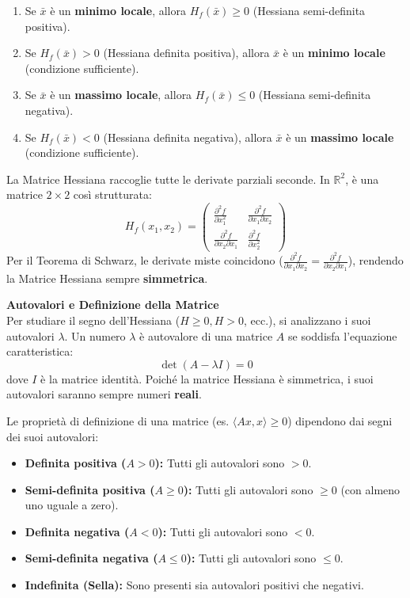 \documentclass[12pt, a4paper]{article}
\begin{document}
	\begin{enumerate}[label=(\Roman*)]
		\item Se $\bar{x}$ è un \textbf{minimo locale}, allora $H_f(\bar{x}) \ge 0$ (Hessiana semi-definita positiva).
		\item Se $H_f(\bar{x}) > 0$ (Hessiana definita positiva), allora $\bar{x}$ è un \textbf{minimo locale} (condizione sufficiente).
		\item Se $\bar{x}$ è un \textbf{massimo locale}, allora $H_f(\bar{x}) \le 0$ (Hessiana semi-definita negativa).
		\item Se $H_f(\bar{x}) < 0$ (Hessiana definita negativa), allora $\bar{x}$ è un \textbf{massimo locale} (condizione sufficiente).
	\end{enumerate}
	
	La Matrice Hessiana raccoglie tutte le derivate parziali seconde. In $\mathbb{R}^2$, è una matrice $2 \times 2$ così strutturata:
	\[
	H_f(x_1, x_2) = 
	\begin{pmatrix}
		\frac{\partial^2 f}{\partial x_1^2} & \frac{\partial^2 f}{\partial x_1 \partial x_2} \\[6pt]
		\frac{\partial^2 f}{\partial x_2 \partial x_1} & \frac{\partial^2 f}{\partial x_2^2}
	\end{pmatrix}
	\]
	Per il Teorema di Schwarz, le derivate miste coincidono ($\frac{\partial^2 f}{\partial x_1 \partial x_2} = \frac{\partial^2 f}{\partial x_2 \partial x_1}$), rendendo la Matrice Hessiana sempre \textbf{simmetrica}.
	
	\textbf{Autovalori e Definizione della Matrice}\\
	Per studiare il segno dell'Hessiana ($H \ge 0, H > 0$, ecc.), si analizzano i suoi autovalori $\lambda$.
	Un numero $\lambda$ è autovalore di una matrice $A$ se soddisfa l'equazione caratteristica:
	\[ \det(A - \lambda I) = 0 \]
	dove $I$ è la matrice identità. Poiché la matrice Hessiana è simmetrica, i suoi autovalori saranno sempre numeri \textbf{reali}.
	
	Le proprietà di definizione di una matrice (es. $\langle Ax, x \rangle \ge 0$) dipendono dai segni dei suoi autovalori:
	\begin{itemize}
		\item \textbf{Definita positiva ($A > 0$):} Tutti gli autovalori sono $> 0$.
		\item \textbf{Semi-definita positiva ($A \ge 0$):} Tutti gli autovalori sono $\ge 0$ (con almeno uno uguale a zero).
		\item \textbf{Definita negativa ($A < 0$):} Tutti gli autovalori sono $< 0$.
		\item \textbf{Semi-definita negativa ($A \le 0$):} Tutti gli autovalori sono $\le 0$.
		\item \textbf{Indefinita (Sella):} Sono presenti sia autovalori positivi che negativi.
	\end{itemize}
	
\end{document}
